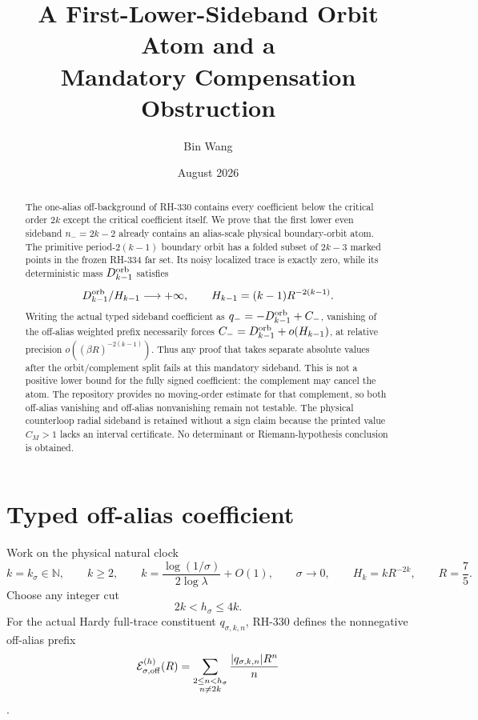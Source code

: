 \documentclass[11pt]{article}
\title{A First-Lower-Sideband Orbit Atom and a\\
Mandatory Compensation Obstruction}
\author{Bin Wang}
\date{August 2026}
\theoremstyle{remark}
\newcommand{\cE}{\mathcal E}
\begin{document}
\maketitle

\begin{abstract}
The one-alias off-background of RH-330 contains every coefficient below the
critical order $2k$ except the critical coefficient itself.  We prove that
the first lower even sideband $n_-=2k-2$ already contains an alias-scale
physical boundary-orbit atom.  The primitive period-$2(k-1)$ boundary orbit
has a folded subset of $2k-3$ marked points in the frozen RH-334 far set.
Its noisy localized trace is exactly zero, while its deterministic mass
$D_{k-1}^{\rm orb}$ satisfies
\[
 D_{k-1}^{\rm orb}/H_{k-1}\longrightarrow+\infty,
 \qquad H_{k-1}=(k-1)R^{-2(k-1)}.
\]
Writing the actual typed sideband coefficient as
$q_-= -D_{k-1}^{\rm orb}+C_-$, vanishing of the off-alias weighted prefix
necessarily forces
$C_-=D_{k-1}^{\rm orb}+o(H_{k-1})$, at relative precision
$o((\beta R)^{-2(k-1)})$.  Thus any proof that takes separate absolute
values after the orbit/complement split fails at this mandatory sideband.
This is not a positive lower bound for the fully signed coefficient: the
complement may cancel the atom.  The repository provides no moving-order
estimate for that complement, so both off-alias vanishing and off-alias
nonvanishing remain not testable.  The physical counterloop radial sideband
is retained without a sign claim because the printed value $C_M>1$ lacks an
interval certificate.  No determinant or Riemann-hypothesis conclusion is
obtained.
\end{abstract}

\section{Typed off-alias coefficient}

Work on the physical natural clock
\begin{equation}\label{eq:clock}
 k=k_\sigma\in\mathbb N,\qquad k\ge2,\qquad
 k=\frac{\log(1/\sigma)}{2\log\lambda}+O(1),
 \qquad \sigma\to0,
 \qquad H_k=kR^{-2k},
 \qquad R=\frac75.
\end{equation}
Choose any integer cut
\begin{equation}\label{eq:cut}
 2k<h_\sigma\le4k.
\end{equation}
For the actual Hardy full-trace constituent $q_{\sigma,k,n}$, RH-330 defines
the nonnegative off-alias prefix
\begin{equation}\label{eq:E-off}
 \cE_{\sigma,\rm off}^{(h)}(R)
 =\sum_{\substack{2\le n<h_\sigma\\ n\ne2k}}
 \frac{|q_{\sigma,k,n}|R^n}{n}
\end{equation}
\citep{WangTransfer2026}.
\end{document}
